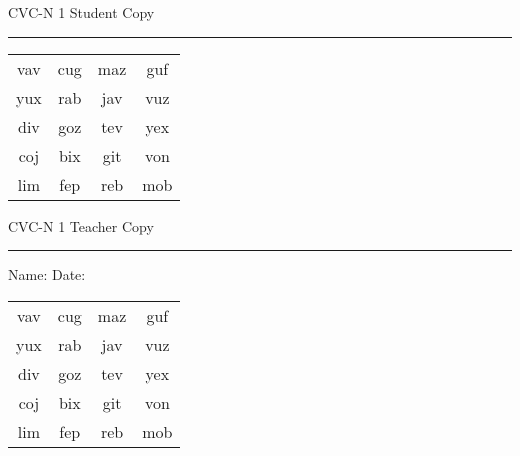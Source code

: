 \documentclass{memoir}
\begin{document}

\footnotesize \noindent
CVC-N 1 \hfill Student Copy
\smallskip
\hrule

\Large

\setlength{\tabcolsep}{14pt}
\def\arraystretch{2}

{\selectfont


\begin{vplace}[0.5]
\begin{center}
\begin{tabular}{cccc}
vav & cug & maz & guf \\
yux & rab & jav & vuz \\
div & goz & tev & yex \\
coj & bix & git & von \\
lim & fep & reb & mob \\
\end{tabular}
\end{center}
\end{vplace}

}

\newpage

\footnotesize \noindent
CVC-N 1 \hfill Teacher Copy
\smallskip
\hrule

\small

\vfill

\noindent
Name: \underline{\hspace{1.75in}} \hfill Date: \underline{\hspace{1in}}

\Large

{\selectfont


\begin{vplace}[0.5]
\begin{center}
\begin{tabular}{cccc}
vav & cug & maz & guf \\
yux & rab & jav & vuz \\
div & goz & tev & yex \\
coj & bix & git & von \\
lim & fep & reb & mob \\
\end{tabular}
\end{center}
\end{vplace}



}
\end{document}
